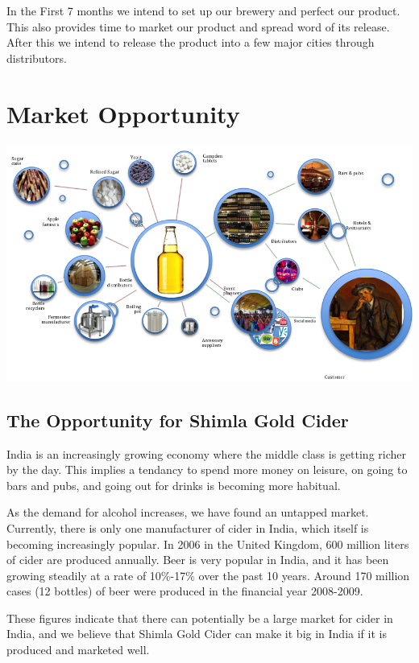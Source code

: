 \documentclass[11pt]{article}
\begin{document}
In the First 7 months we intend to set up our brewery and perfect our product.
This also provides time to market our product and spread word of its release.
After this we intend to release the product into a few major cities through
distributors.

\newpage
\section{Market Opportunity}
  \includegraphics[angle=90,width=\textwidth,height=\textheight,keepaspectratio]
{./supplychain.png}

  \subsection{The Opportunity for Shimla Gold Cider}
India is an increasingly growing economy where the middle class is getting
richer by the day. This implies a tendancy to spend more money on leisure, on
going to bars and pubs, and going out for drinks is becoming more habitual.

As the demand for alcohol increases, we have found an untapped market.
Currently, there is only one manufacturer of cider in India, which itself is becoming increasingly popular. In 2006 in the United Kingdom, 600 million liters of cider are produced annually. Beer is very popular in India, and it has been growing steadily at a rate of 10\%-17\% over the past 10 years. Around 170 million cases (12 bottles) of beer were produced in the financial year 2008-2009.

These figures indicate that there can potentially be a large market for cider in India, and we believe that Shimla Gold Cider can make it big in India if it is produced and marketed well. \\
\end{document}
